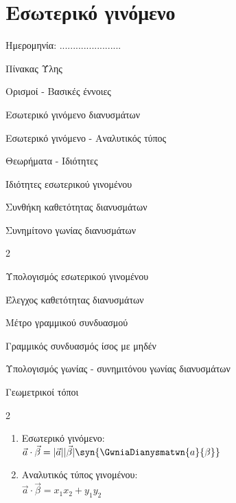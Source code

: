 \documentclass[twoside,nofonts,internet,math,spyros]{frontisthrio}
\newcommand{\myitem}{\stepcounter{enumi}\item[\raisebox{0.5mm}{\faEdit}\ \Large$\square$]}
\begin{document}
\newpage
\section{Εσωτερικό γινόμενο}
\begin{flushright}
\faCalendar* Ημερομηνία: .......................
\end{flushright}
\begin{mybox}[mysubtitle]{Πίνακας Ύλης}
\begin{tcbraster}[raster columns=2,raster equal height]
\begin{myleftbox}{Ορισμοί - Βασικές έννοιες\ \ \faBook}
\begin{arithmisi}[itemsep=0mm]
\item Εσωτερικό γινόμενο διανυσμάτων
\item Εσωτερικό γινόμενο - Αναλυτικός τύπος
\end{arithmisi}
\end{myleftbox}
\begin{myrightbox}{Θεωρήματα - Ιδιότητες\ \ \faTools}
\begin{arithmisi}[itemsep=0mm]
\item Ιδιότητες εσωτερικού γινομένου
\item Συνθήκη καθετότητας διανυσμάτων
\item Συνημίτονο γωνίας διανυσμάτων
\end{arithmisi}
\end{myrightbox}
\end{tcbraster}
\begin{multicols}{2}
\begin{todolist}[itemsep=0mm]
\myitem Υπολογισμός εσωτερικού γινομένου
\myitem Έλεγχος καθετότητας διανυσμάτων
\item Μέτρο γραμμικού συνδυασμού
\item Γραμμικός συνδυασμός ίσος με μηδέν
\myitem Υπολογισμός γωνίας - συνημιτόνου γωνίας διανυσμάτων
\item Γεωμετρικοί τόποι
\end{todolist}
\end{multicols}
\begin{multicols}{2}
\begin{enumerate}[itemsep=0mm,leftmargin=5mm]
\item Εσωτερικό γινόμενο: \\$\vec{a}\cdot\vec{\beta}=|\vec{a}||\vec{\beta}|\syn{\GwniaDianysmatwn{a}{\beta}}$
\item Αναλυτικός τύπος γινομένου:\\$\vec{a}\cdot\vec{\beta}=x_1x_2+y_1y_2$

\end{enumerate}
\end{multicols}
\end{mybox}
\end{document}
